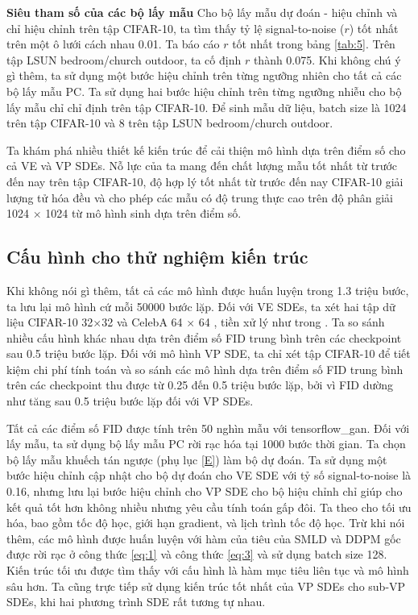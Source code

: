 \documentclass{article} %
\begin{document}
\textbf{Siêu tham số của các bộ lấy mẫu} Cho bộ lấy mẫu dự đoán - hiệu chỉnh và chỉ hiệu chỉnh trên tập CIFAR-10, ta tìm thấy tỷ lệ signal-to-noise ($r$) tốt nhất trên một ô lưới cách nhau 0.01.
Ta báo cáo $r$ tốt nhất trong bảng \ref{tab:5}.
Trên tập LSUN bedroom/church outdoor, ta cố định $r$ thành 0.075.
Khi không chú ý gì thêm, ta sử dụng một bước hiệu chỉnh trên từng ngưỡng nhiên cho tất cả các bộ lấy mẫu PC.
Ta sử dụng hai bước hiệu chỉnh trên từng ngưỡng nhiễu cho bộ lấy mẫu chỉ chỉ định trên tập CIFAR-10.
Để sinh mẫu dữ liệu, batch size là 1024 trên tập CIFAR-10 và 8 trên tập LSUN bedroom/church outdoor.

\label{Các cải thiện về kiến trúc mô hình} \label{H}

Ta khám phá nhiều thiết kế kiến trúc để cải thiện mô hình dựa trên điểm số cho cả VE và VP SDEs.
Nỗ lực của ta mang đến chất lượng mẫu tốt nhất từ trước đến nay trên tập CIFAR-10, độ hợp lý tốt nhất từ trước đến nay CIFAR-10 giải lượng tử hóa đều và cho phép các mẫu có độ trung thực cao trên độ phân giải 1024 $\times$ 1024 từ mô hình sinh dựa trên điểm số.

\subsection{Cấu hình cho thử nghiệm kiến trúc} \label{H.1}

Khi không nói gì thêm, tất cả các mô hình được huấn luyện trong 1.3 triệu bước, ta lưu lại mô hình cứ mỗi 50000 bước lặp.
Đối với VE SDEs, ta xét hai tập dữ liệu CIFAR-10 32$\times$32 \citep{krizhevsky2009learning} và CelebA 64 $\times$ 64 \citep{liu2015deep}, tiền xử lý như trong \citep{song2019generative}.
Ta so sánh nhiều cấu hình khác nhau dựa trên điểm số FID trung bình trên các checkpoint sau 0.5 triệu bước lặp.
Đối với mô hình VP SDE, ta chỉ xét tập CIFAR-10 để tiết kiệm chi phí tính toán và so sánh các mô hình dựa trên điểm số FID trung bình trên các checkpoint thu được từ 0.25 đến 0.5 triệu bước lặp, bởi vì FID dường như tăng sau 0.5 triệu bước lặp đối với VP SDEs.

Tất cả các điểm số FID được tính trên 50 nghìn mẫu với tensorflow\_gan.
Đối với lấy mẫu, ta sử dụng bộ lấy mẫu PC rời rạc hóa tại 1000 bước thời gian.
Ta chọn bộ lấy mẫu khuếch tán ngược (phụ lục \ref{E}) làm bộ dự đoán.
Ta sử dụng một bước hiệu chỉnh cập nhật cho bộ dự đoán cho VE SDE với tỷ số signal-to-noise là 0.16,
nhưng lưu lại bước hiệu chỉnh cho VP SDE cho bộ hiệu chỉnh chỉ giúp cho kết quả tốt hơn không nhiều nhưng yêu cầu tính toán gấp đôi.
Ta theo \citep{ho2020denoising} cho tối ưu hóa, bao gồm tốc độ học, giới hạn gradient, và lịch trình tốc độ học.
Trừ khi nói thêm, các mô hình được huấn luyện với hàm của tiêu của SMLD và DDPM gốc được rời rạc ở công thức \ref{eq:1} và công thức \ref{eq:3} và sử dụng batch size 128.
Kiến trúc tối ưu được tìm thấy với cấu hình là hàm mục tiêu liên tục và mô hình sâu hơn.
Ta cũng trực tiếp sử dụng kiến trúc tốt nhất của VP SDEs cho sub-VP SDEs, khi hai phương trình SDE rất tương tự nhau.
\end{document}
